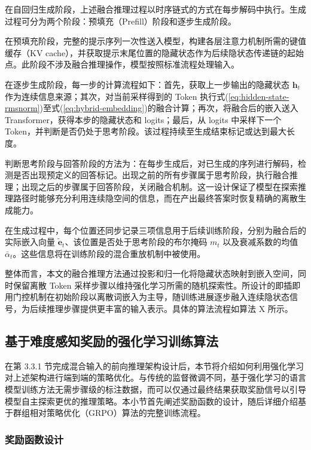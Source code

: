 在自回归生成阶段，上述融合推理过程以时序链式的方式在每步解码中执行。生成过程可分为两个阶段：预填充（Prefill）阶段和逐步生成阶段。

在预填充阶段，完整的提示序列一次性送入模型，构建各层注意力机制所需的键值缓存（KV cache），并获取提示末尾位置的隐藏状态作为后续隐状态传递链的起始点。此阶段不涉及融合推理操作，模型按照标准流程处理输入。

在逐步生成阶段，每一步的计算流程如下：首先，获取上一步输出的隐藏状态 $\mathbf{h}_t$ 作为连续信息来源；其次，对当前采样得到的 Token 执行式(\ref{eq:hidden-state-rmsnorm})至式(\ref{eq:hybrid-embedding})的融合计算；再次，将融合后的嵌入送入 Transformer，获得本步的隐藏状态和 logits；最后，从 logits 中采样下一个 Token，并判断是否仍处于思考阶段。该过程持续至生成结束标记或达到最大长度。

判断思考阶段与回答阶段的方法为：在每步生成后，对已生成的序列进行解码，检测是否出现预定义的回答标记。出现之前的所有步骤属于思考阶段，执行融合推理；出现之后的步骤属于回答阶段，关闭融合机制。这一设计保证了模型在探索推理路径时能够充分利用连续隐空间的信息，而在产出最终答案时恢复精确的离散生成能力。

在生成过程中，每个位置还同步记录三项信息用于后续训练阶段，分别为融合后的实际嵌入向量 $\tilde{\mathbf{e}}_t$、该位置是否处于思考阶段的布尔掩码 $m_t$ 以及衰减系数的均值 $\bar{\alpha}_t$。这些信息将在训练阶段的混合重放机制中被使用。

整体而言，本文的融合推理方法通过投影和归一化将隐藏状态映射到嵌入空间，同时保留离散 Token 采样步骤以维持强化学习所需的随机探索性。所设计的即插即用门控机制在初始阶段以离散词嵌入为主导，随训练进展逐步融入连续隐状态信号，为后续推理步骤提供更丰富的输入表示。具体的算法流程如算法 X 所示。

\subsection{基于难度感知奖励的强化学习训练算法}

在第 3.3.1 节完成混合输入的前向推理架构设计后，本节将介绍如何利用强化学习对上述架构进行端到端的策略优化。与传统的监督微调不同，基于强化学习的语言模型训练方法无需步骤级的标注数据，而可以仅通过最终结果获取奖励信号以引导模型自主探索更优的推理策略。本小节首先阐述奖励函数的设计，随后详细介绍基于群组相对策略优化（GRPO）算法的完整训练流程。

\subsubsection{奖励函数设计}

